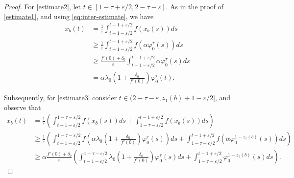 \documentclass[10pt,a4paper]{amsart}
\begin{document}
\begin{proof}
For \eqref{estimate2}, let $t\in[1-\tau+\varepsilon/2,2-\tau-\varepsilon]$. As in the proof of \eqref{estimate1}, and using \eqref{eq:inter-estimate}, we have
\begin{align*}
    x_b(t) &= \frac{1}{\varepsilon} \int_{t-1-\varepsilon/2}^{t-1+\varepsilon/2} f(x_b(s)) ds \\
    & \geq \frac{1}{\varepsilon} \int_{t-1-\varepsilon/2}^{t-1+\varepsilon/2} f(\alpha\varphi_0^\tau(s)) ds \\
    &\geq \frac{f'(0)+\delta_0}{\varepsilon} \int_{t-1-\varepsilon/2}^{t-1+\varepsilon/2} \alpha\varphi_0^\tau(s) ds \\
    &=\alpha\lambda_0\left( 1+\frac{\delta_0}{f'(0)} \right)\varphi_0^\tau(t).
\end{align*}

Subsequently, for \eqref{estimate3} consider $t\in(2-\tau-\varepsilon,z_1(b)+1-\varepsilon/2]$, and observe that
\begin{align*}
    x_b(t) &= \frac{1}{\varepsilon} \left( \int_{t-1-\varepsilon/2}^{1-\tau-\varepsilon/2} f(x_b(s)) ds + \int_{1-\tau-\varepsilon/2}^{t-1+\varepsilon/2} f(x_b(s)) ds \right) \\
    &\geq \frac{1}{\varepsilon} \left( \int_{t-1-\varepsilon/2}^{1-\tau-\varepsilon/2} f\left( \alpha\lambda_0\left( 1+\frac{\delta_0}{f'(0)}\right)\varphi_0^\tau(s) \right) ds + \int_{1-\tau-\varepsilon/2}^{t-1+\varepsilon/2} f(\alpha\varphi_0^{1-z_1(b)}(s)) ds \right) \\
    &\geq \alpha\frac{f'(0)+\delta_0}{\varepsilon} \left( \int_{t-1-\varepsilon/2}^{1-\tau-\varepsilon/2} \lambda_0\left( 1+\frac{\delta_0}{f'(0)}\right)\varphi_0^\tau(s) ds + \int_{1-\tau-\varepsilon/2}^{t-1+\varepsilon/2} \varphi_0^{1-z_1(b)}(s) ds \right).
\end{align*}


\end{proof}
\end{document}
